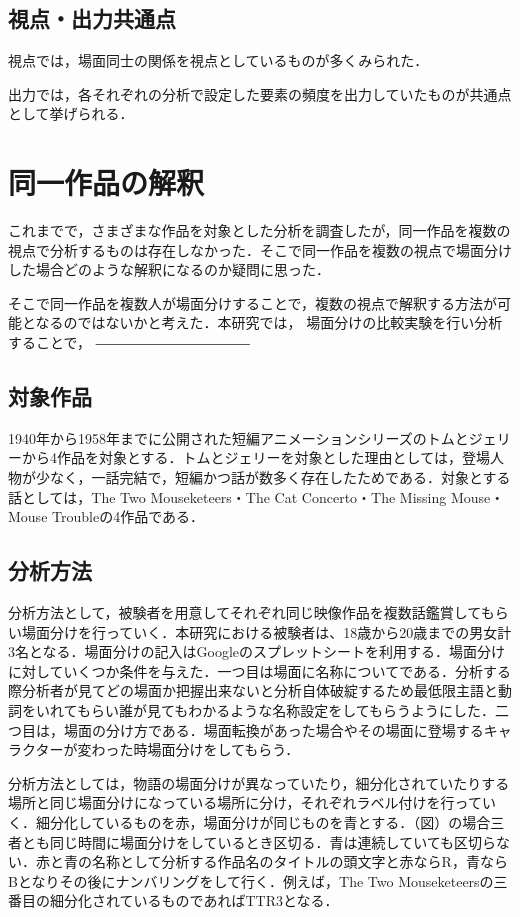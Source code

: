 \subsection{視点・出力共通点}
視点では，場面同士の関係を視点としているものが多くみられた．

出力では，各それぞれの分析で設定した要素の頻度を出力していたものが共通点として挙げられる．


\section{同一作品の解釈}
これまでで，さまざまな作品を対象とした分析を調査したが，同一作品を複数の視点で分析するものは存在しなかった．そこで同一作品を複数の視点で場面分けした場合どのような解釈になるのか疑問に思った．

そこで同一作品を複数人が場面分けすることで，複数の視点で解釈する方法が可能となるのではないかと考えた．本研究では，
場面分けの比較実験を行い分析することで，
―――――――――――

\subsection{対象作品}
1940年から1958年までに公開された短編アニメーションシリーズのトムとジェリー\cite{tom}から4作品を対象とする．トムとジェリーを対象とした理由としては，登場人物が少なく，一話完結で，短編かつ話が数多く存在したためである．対象とする話としては，The Two Mouseketeers・The Cat Concerto・The Missing Mouse・Mouse Troubleの4作品である．

\subsection{分析方法}
分析方法として，被験者を用意してそれぞれ同じ映像作品を複数話鑑賞してもらい場面分けを行っていく．本研究における被験者は、18歳から20歳までの男女計3名となる．場面分けの記入はGoogleのスプレットシートを利用する．場面分けに対していくつか条件を与えた．一つ目は場面に名称についてである．分析する際分析者が見てどの場面か把握出来ないと分析自体破綻するため最低限主語と動詞をいれてもらい誰が見てもわかるような名称設定をしてもらうようにした．二つ目は，場面の分け方である．場面転換があった場合やその場面に登場するキャラクターが変わった時場面分けをしてもらう．

分析方法としては，物語の場面分けが異なっていたり，細分化されていたりする場所と同じ場面分けになっている場所に分け，それぞれラベル付けを行っていく．細分化しているものを赤，場面分けが同じものを青とする．（図）の場合三者とも同じ時間に場面分けをしているとき区切る．青は連続していても区切らない．赤と青の名称として分析する作品名のタイトルの頭文字と赤ならR，青ならBとなりその後にナンバリングをして行く．例えば，The Two Mouseketeersの三番目の細分化されているものであればTTR3となる．

